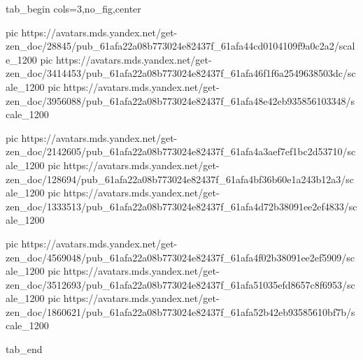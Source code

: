  
 
 
 
 

\ifcmt
  tab_begin cols=3,no_fig,center

     pic https://avatars.mds.yandex.net/get-zen_doc/28845/pub_61afa22a08b773024e82437f_61afa44cd0104109f9a0c2a2/scale_1200
		 pic https://avatars.mds.yandex.net/get-zen_doc/3414453/pub_61afa22a08b773024e82437f_61afa46f1f6a2549638503dc/scale_1200
		 pic https://avatars.mds.yandex.net/get-zen_doc/3956088/pub_61afa22a08b773024e82437f_61afa48e42eb935856103348/scale_1200

		 pic https://avatars.mds.yandex.net/get-zen_doc/2142605/pub_61afa22a08b773024e82437f_61afa4a3aef7ef1bc2d53710/scale_1200
		 pic https://avatars.mds.yandex.net/get-zen_doc/128694/pub_61afa22a08b773024e82437f_61afa4bf36b60e1a243b12a3/scale_1200
		 pic https://avatars.mds.yandex.net/get-zen_doc/1333513/pub_61afa22a08b773024e82437f_61afa4d72b38091ee2ef4833/scale_1200

		 pic https://avatars.mds.yandex.net/get-zen_doc/4569048/pub_61afa22a08b773024e82437f_61afa4f02b38091ee2ef5909/scale_1200
		 pic https://avatars.mds.yandex.net/get-zen_doc/3512693/pub_61afa22a08b773024e82437f_61afa51035efd8657c8f6953/scale_1200
		 pic https://avatars.mds.yandex.net/get-zen_doc/1860621/pub_61afa22a08b773024e82437f_61afa52b42eb93585610bf7b/scale_1200

  tab_end
\fi
